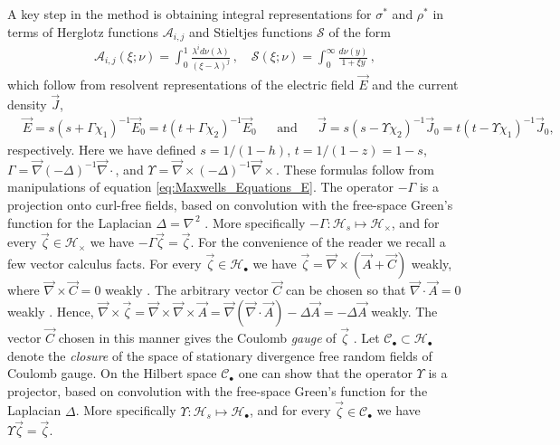 \documentclass[english,12pt,jmp,graphicx]{revtex4-1}
\begin{document}
A key step in the method is obtaining integral representations for
$\sigma^*$ and $\rho^*$ in terms of Herglotz functions
$\mathcal{A}_{i,j}$ and Stieltjes functions $\mathcal{S}$ of the
form \cite{Henrici:1974:v3}
%
\begin{align}\label{eq:Integral_Reps}
  \mathcal{A}_{i,j}(\xi;\nu)=\int_0^1\frac{\lambda^id\nu(\lambda)}{(\xi-\lambda)^j}\,, \quad
  \mathcal{S}(\xi;\nu)=\int_0^\infty\frac{d\nu(y)}{1+\xi y}\,,
\end{align}
%
which follow from resolvent representations
of the electric field $\vec{E}$ and the current density $\vec{J}$,    
%
\begin{align}\label{eq:Resolvent_representations_E_D}
  &\vec{E}=s(s+\Gamma\chi_1)^{-1}\vec{E}_0=t(t+\Gamma\chi_2)^{-1}\vec{E}_0 &&\text{and}
  &&\vec{J}=s(s-\Upsilon\chi_2)^{-1}\vec{J}_0=t(t-\Upsilon\chi_1)^{-1}\vec{J}_0,
\end{align}
%
respectively. Here we have defined $s=1/(1-h)$, $t=1/(1-z)=1-s$,
$\Gamma=\vec{\nabla}(-\Delta)^{-1}\vec{\nabla}\cdot$, and
$\Upsilon=\vec{\nabla}\times(-\Delta)^{-1}\vec{\nabla}\times$. These formulas follow from
manipulations of equation \eqref{eq:Maxwells_Equations_E}. The operator
$-\Gamma$ is a projection onto curl-free fields, based on convolution with
the free-space Green's function for the Laplacian $\Delta=\nabla^{\,2}$
\cite{Golden:CMP-473}. More specifically
$-\Gamma:\mathscr{H}_s\mapsto\mathscr{H}_\times$, and for every
$\vec{\zeta}\in\mathscr{H}_\times$ we have $-\Gamma\vec{\zeta}=\vec{\zeta}$. 
For the convenience of the reader we recall a few vector calculus
facts. For every $\vec{\zeta}\in\mathscr{H}_\bullet$ we have
$\vec{\zeta}=\vec{\nabla}\times(\vec{A}+\vec{C})$ weakly, where $\vec{\nabla}\times\vec{C}=0$
weakly \cite{Jackson-1999,Folland:95}. The arbitrary vector $\vec{C}$
can be chosen so that $\vec{\nabla}\cdot\vec{A}=0$ weakly
\cite{Jackson-1999}. Hence, $\vec{\nabla}\times\vec{\zeta}=\vec{\nabla}\times\vec{\nabla}\times\vec{A}
=\vec{\nabla}(\vec{\nabla}\cdot\vec{A})-\Delta\vec{A}=-\Delta\vec{A}$ weakly. The vector
$\vec{C}$ chosen in this manner gives the Coulomb
\emph{gauge} of $\vec{\zeta}$ \cite{Jackson-1999}. Let
$\mathscr{C}_{\bullet}\subset\mathscr{H}_{\bullet}$ denote the \emph{closure} of the
space of stationary divergence free random fields of Coulomb gauge. On
the Hilbert space $\mathscr{C}_{\bullet}$ one can show that the
operator $\Upsilon$ is a projector, based on convolution with the
free-space Green's function for the Laplacian $\Delta$. More specifically
$\Upsilon:\mathscr{H}_s\mapsto\mathscr{H}_\bullet$, and for every $\vec{\zeta}\in\mathscr{C}_\bullet$
we have $\Upsilon\vec{\zeta}=\vec{\zeta}$.  
\end{document}
